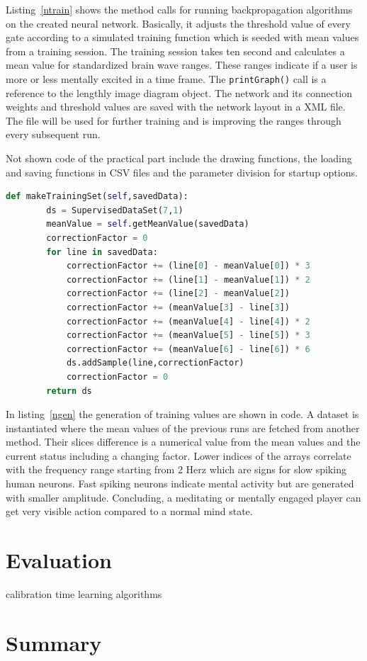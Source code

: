 \documentclass[bibtotocnumbered, headsepline,normalheadings,12pt]{report}
\begin{document}
Listing~\ref{ntrain} shows the method calls for running backpropagation algorithms on the created neural network. Basically, it adjusts the threshold
value of every gate according to a simulated training function which is seeded with mean values from a training session. The training session takes
ten second and calculates a mean value for standardized brain wave ranges. These ranges indicate if a user is more or less mentally excited in a
time frame. The \texttt{printGraph()} call is a reference to the lengthly image diagram object. The network and its connection weights and threshold values
are saved with the network layout in a XML file. The file will be used for further training and is improving the ranges through every subsequent run.

Not shown code of the practical part include the drawing functions, the loading and saving functions in CSV files and the parameter division for startup
options. 


\begin{lstlisting}[float,language=Python,caption=Generating Training Values, label=ngen]
    def makeTrainingSet(self,savedData):
        ds = SupervisedDataSet(7,1)
        meanValue = self.getMeanValue(savedData)
        correctionFactor = 0
        for line in savedData:
            correctionFactor += (line[0] - meanValue[0]) * 3
            correctionFactor += (line[1] - meanValue[1]) * 2
            correctionFactor += (line[2] - meanValue[2])
            correctionFactor += (meanValue[3] - line[3])
            correctionFactor += (meanValue[4] - line[4]) * 2
            correctionFactor += (meanValue[5] - line[5]) * 3
            correctionFactor += (meanValue[6] - line[6]) * 6
            ds.addSample(line,correctionFactor)
            correctionFactor = 0
        return ds
\end{lstlisting}

In listing~\ref{ngen} the generation of training values are shown in code. A dataset is instantiated where the mean values of the previous runs 
are fetched from another method. Their slices difference is a numerical value from the mean values and the current status including a changing factor.
Lower indices of the arrays correlate with the frequency range starting from 2 Herz which are signs for slow spiking human neurons. Fast spiking neurons
indicate mental activity but are generated with smaller amplitude. Concluding, a meditating or mentally engaged 
player can get very visible action compared to a normal mind state.



\chapter{Evaluation}
\label{chap:eva}

calibration time
learning algorithms

\chapter{Summary}
\label{chap:sum}

\nocite{*}


\listoffigures
\lstlistoflistings
\end{document}
